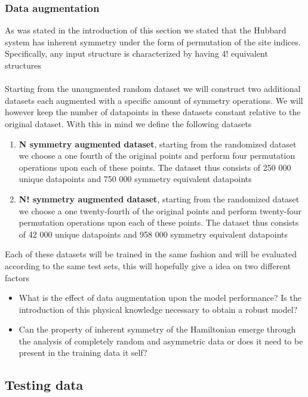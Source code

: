 \documentclass[12pt]{article}
\begin{document}
\subsubsection{Data augmentation}
As was stated in the introduction of this section we stated that the Hubbard system has inherent symmetry under the form of permutation of the site indices. Specifically, any input structure is characterized by having 4! equivalent structures
\\
\\
Starting from the unaugmented random dataset we will construct two additional datasets each augmented with a specific amount of symmetry operations. We will however keep the number of datapoints in these datasets constant relative to the original dataset. With this in mind we define the following datasets
\begin{enumerate}
	\item \textbf{N symmetry augmented dataset}, starting from the randomized dataset we choose a one fourth of the original points and perform four permutation operations upon each of these points. The dataset thus consists of 250 000 unique datapoints and 750 000 symmetry equivalent datapoints
	\item \textbf{N! symmetry augmented dataset}, starting from the randomized dataset we choose a one twenty-fourth of the original points and perform twenty-four permutation operations upon each of these points. The dataset thus consists of 42 000 unique datapoints and 958 000 symmetry equivalent datapoints
\end{enumerate}
Each of these datasets will be trained in the same fashion and will be evaluated according to the same test sets, this will hopefully give a idea on two different factors
\begin{itemize}
	\item What is the effect of data augmentation upon the model performance? Is the introduction of this physical knowledge necessary to obtain a robust model?
	\item Can the property of inherent symmetry of the Hamiltonian emerge through the analysis of completely random and asymmetric data or does it need to be present in the training data it self? 
\end{itemize}

\subsection{Testing data}
\end{document}
